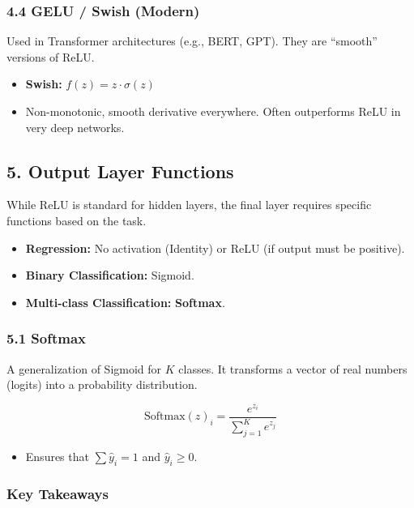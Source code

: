 \documentclass[
  italian,
  11pt,
]{article}
\providecommand{\tightlist}{%
  \setlength{\itemsep}{0pt}\setlength{\parskip}{0pt}}
\begin{document}
\subsubsection{4.4 GELU / Swish (Modern)}\label{gelu-swish-modern}

Used in Transformer architectures (e.g., BERT, GPT). They are ``smooth''
versions of ReLU.

\begin{itemize}
\item
  \textbf{Swish:} \(f(z) = z \cdot \sigma(z)\)
\item
  Non-monotonic, smooth derivative everywhere. Often outperforms ReLU in
  very deep networks.
\end{itemize}

\subsection{5. Output Layer Functions}\label{output-layer-functions}

While ReLU is standard for hidden layers, the final layer requires
specific functions based on the task.

\begin{itemize}
\item
  \textbf{Regression:} No activation (Identity) or ReLU (if output must
  be positive).
\item
  \textbf{Binary Classification:} Sigmoid.
\item
  \textbf{Multi-class Classification:} \textbf{Softmax}.
\end{itemize}

\subsubsection{5.1 Softmax}\label{softmax}

A generalization of Sigmoid for \(K\) classes. It transforms a vector of
real numbers (logits) into a probability distribution.

\[\text{Softmax}(z)_i = \frac{e^{z_i}}{\sum_{j=1}^K e^{z_j}}\]

\begin{itemize}
\tightlist
\item
  Ensures that \(\sum \hat{y}_i = 1\) and \(\hat{y}_i \geq 0\).
\end{itemize}

\subsubsection{Key Takeaways}\label{key-takeaways-24}
\end{document}
